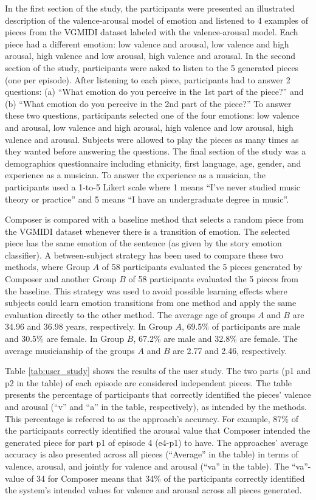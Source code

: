 In the first section of the study, the participants were presented an illustrated description of the valence-arousal model of emotion and listened to 4 examples of pieces from the VGMIDI dataset labeled with the valence-arousal model. Each piece had a different emotion: low valence and arousal, low valence and high arousal, high valence and low arousal, high valence and arousal. In the second section of the study, participants were asked to listen to the 5 generated pieces (one per episode). After listening to each piece, participants had to answer 2 questions: (a) ``What emotion do you perceive in the 1st part of the piece?'' and (b) ``What emotion do you perceive in the 2nd part of the piece?'' To answer these two questions, participants selected one of the four emotions: low valence and arousal, low valence and high arousal, high valence and low arousal, high valence and arousal. Subjects were allowed to play the pieces as many times as they wanted before answering the questions.
The final section of the study was a demographics questionnaire including ethnicity, first language, age, gender, and experience as a musician. To answer the experience as a musician, the participants used a 1-to-5 Likert scale where 1 means ``I've never studied music theory or practice'' and 5 means ``I have an undergraduate degree in music''.

Composer is compared with a baseline method that selects a random piece from the VGMIDI dataset whenever there is a transition of emotion. The selected piece has the same emotion of the sentence (as given by the story emotion classifier). A between-subject strategy has been used to compare these two methods, where Group $A$ of 58 participants evaluated the 5 pieces generated by Composer and another Group $B$ of 58 participants evaluated the 5 pieces from the baseline. This strategy was used to avoid possible learning effects where subjects could learn emotion transitions from one method and apply the same evaluation directly to the other method. The average age of groups $A$ and $B$ are 34.96 and 36.98 years, respectively. In Group $A$, 69.5\% of participants are male and 30.5\% are female. In Group $B$, 67.2\% are male and 32.8\% are female. The average musicianship of the groups $A$ and $B$ are 2.77 and 2.46, respectively.

Table \ref{tab:user_study} shows the results of the user study. The two parts (p1 and p2 in the table) of each episode are considered independent pieces. The table presents the percentage of participants that correctly identified the pieces' valence and arousal (``v'' and ``a'' in the table, respectively), as intended by the methods. This percentage is refeered to as the approach's accuracy. For example, 87\% of the participants correctly identified the arousal value that Composer intended the generated piece for part p1 of episode 4 (e4-p1) to have. The approaches' average accuracy is also presented across all pieces (``Average'' in the table) in terms of valence, arousal, and jointly for valence and arousal (``va'' in the table). The ``va''-value of 34 for Composer means that 34\% of the participants correctly identified the system's intended values for valence and arousal across all pieces generated.

